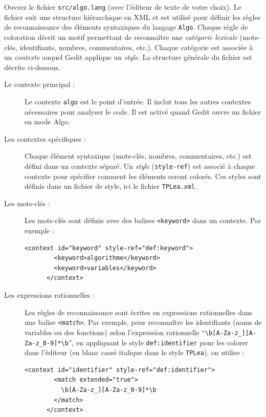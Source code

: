 \documentclass[correction]{td}
\begin{document}
\begin{exercice}

  Ouvrez le fichier \lstinline{src/algo.lang} (avec l'éditeur de texte de votre choix).
  Le fichier suit une structure hiérarchique en XML et est utilisé pour définir les règles de reconnaissance des éléments syntaxiques du langage \texttt{Algo}.
  Chaque règle de coloration décrit un motif permettant de reconnaître une \emph{catégorie lexicale} (mots-clés, identifiants, nombres, commentaires, etc.).
  Chaque catégorie est associée à un \emph{contexte} auquel Gedit applique un \emph{style}.
  La structure générale du fichier est décrite ci-dessous.
  
  \begin{description}
  \item[Le contexte principal :]
    Le contexte \texttt{algo} est le point d'entrée. Il inclut tous les autres contextes nécessaires pour analyser le code.
    Il est activé quand Gedit ouvre un fichier en mode Algo.
  \item[Les contextes spécifiques :]
    Chaque élément syntaxique (mots-clés, nombres, commentaires, etc.) est défini dans un contexte séparé.
    Un \emph{style} (\texttt{style-ref}) est associé à chaque contexte pour spécifier comment les éléments seront colorés.
    Ces styles sont définis dans un fichier de style, ici le fichier \lstinline{TPLea.xml}.
  \item[Les mots-clés :]
    Les mots-clés sont définis avec des balises \texttt{<keyword>} dans un contexte. Par exemple : 
    \begin{lstlisting}[gobble=6]
      <context id="keyword" style-ref="def:keyword">
        <keyword>algorithme</keyword>
        <keyword>variables</keyword>
      </context>
    \end{lstlisting}
  \item[Les expressions rationnelles :]
    Les règles de reconnaissance sont écrites en expressions rationnelles dans une balise \texttt{<match>}.
    Par exemple, pour reconnaître les identifiants (noms de variables ou des fonctions)
    selon l'expression rationnelle ``\lstinline{\b[A-Za-z_][A-Za-z_0-9]*\b}'',
    en appliquant le style \lstinline{def:identifier} pour les colorer dans l'éditeur (en blanc cassé italique dans le style \lstinline{TPLea}), on utilise :
    \begin{lstlisting}[gobble=6]
      <context id="identifier" style-ref="def:identifier">
        <match extended="true">
          \b[A-Za-z_][A-Za-z_0-9]*\b
        </match>
      </context>
    \end{lstlisting}
  \end{description}


\end{exercice}
\end{document}
